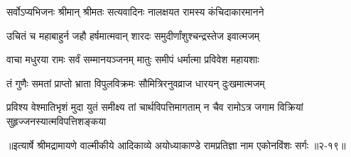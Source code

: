 \twolineshloka
{सर्वोऽप्यभिजनः श्रीमान् श्रीमतः सत्यवादिनः}
{नालक्षयत रामस्य कंचिदाकारमानने} %

\twolineshloka
{उचितं च महाबाहुर्न जहौ हर्षमात्मवान्}
{शारदः समुदीर्णांशुश्चन्द्रस्तेज इवात्मजम्} %

\twolineshloka
{वाचा मधुरया रामः सर्वं सम्मानयञ्जनम्}
{मातुः समीपं धर्मात्मा प्रविवेश महायशाः} %

\twolineshloka
{तं गुणैः समतां प्राप्तो भ्राता विपुलविक्रमः}
{सौमित्रिरनुवव्राज धारयन् दुःखमात्मजम्} %

\twolineshloka
{प्रविश्य वेश्मातिभृशं मुदा युतं समीक्ष्य तां चार्थविपत्तिमागताम्}
{न चैव रामोऽत्र जगाम विक्रियां सुहृज्जनस्यात्मविपत्तिशङ्कया} %


॥इत्यार्षे श्रीमद्रामायणे वाल्मीकीये आदिकाव्ये अयोध्याकाण्डे रामप्रतिज्ञा नाम एकोनविंशः सर्गः ॥२-१९॥
